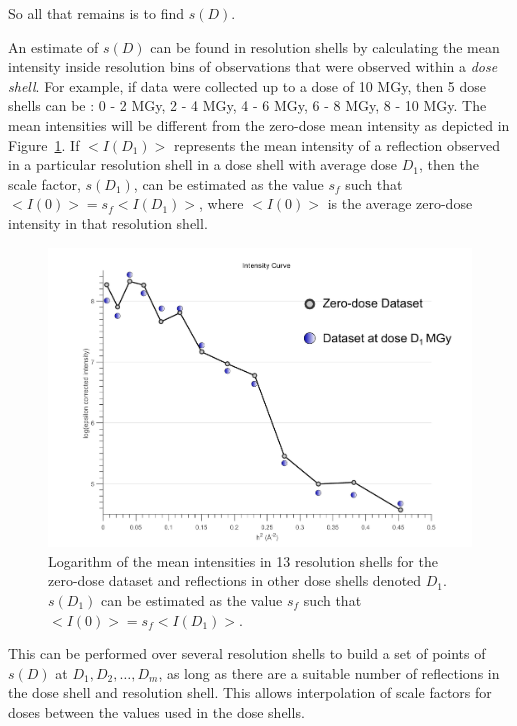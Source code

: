 So all that remains is to find $s(D)$.

An estimate of $s(D)$ can be found in resolution shells by calculating the mean intensity inside resolution bins of observations that were observed within a \textit{dose shell}.
For example, if data were collected up to a dose of 10 MGy, then 5 dose shells can be : 0 - 2 MGy, 2 - 4 MGy, 4 - 6 MGy, 6 - 8 MGy, 8 - 10 MGy.
The mean intensities will be different from the zero-dose mean intensity as depicted in Figure~\ref{fig:mean intensity in resolution shells, various doses - Extrapolation method}.
If $<I(D_1)>$ represents the mean intensity of a reflection observed in a particular resolution shell in a dose shell with average dose $D_1$, then the scale factor, $s(D_1)$, can be estimated as the value $s_f$ such that $<I(0)> = s_f <I(D_1)>$, where $<I(0)>$ is the average zero-dose intensity in that resolution shell.
\begin{figure}
  \centering
    \includegraphics[width=1\textwidth]{figures/zde/extrapolationscaling_scale_points.pdf}
    \caption{Logarithm of the mean intensities in 13 resolution shells for the zero-dose dataset and reflections in other dose shells denoted $D_1$.
    $s(D_1)$ can be estimated as the value $s_f$ such that $<I(0)> = s_f <I(D_1)>$.}
    \label{fig:mean intensity in resolution shells, various doses - Extrapolation method}
\end{figure}
This can be performed over several resolution shells to build a set of points of $s(D)$ at $D_1, D_2,\ldots, D_m$, as long as there are a suitable number of reflections in the dose shell and resolution shell.
This allows interpolation of scale factors for doses between the values used in the dose shells.
